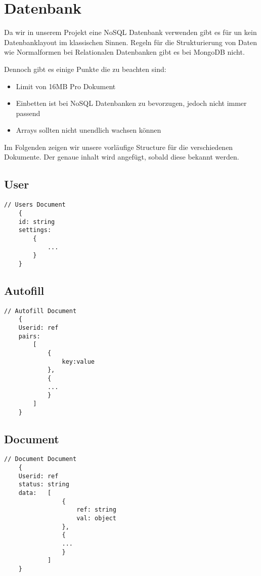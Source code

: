 \chapter{Datenbank}
Da wir in unserem Projekt eine NoSQL Datenbank verwenden gibt es für un kein Datenbanklayout im klassischen Sinnen.
Regeln für die Strukturierung von Daten wie Normalformen bei Relationalen Datenbanken gibt es bei MongoDB nicht.

Dennoch gibt es einige Punkte die zu beachten sind:
\begin{itemize}
    \item Limit von 16\ac{MB} Pro Dokument
    \item Einbetten ist bei NoSQL Datenbanken zu bevorzugen, jedoch nicht immer passend
    \item Arrays sollten nicht unendlich wachsen können
\end{itemize}

Im Folgenden zeigen wir unsere vorläufige Structure für die verschiedenen Dokumente.
Der genaue inhalt wird angefügt, sobald diese bekannt werden.

\section{User}

\begin{lstlisting}[label={lst:lstlistingusers}]
    // Users Document
    {
    id: string
    settings:
        {
            ...
        }
    }

\end{lstlisting}

\section{Autofill}
\begin{lstlisting}[label={lst:lstlistingauto}]
    // Autofill Document
    {
    Userid: ref
    pairs:
        [
            {
                key:value
            },
            {
            ...
            }
        ]
    }

\end{lstlisting}

\section{Document}
\begin{lstlisting}[label={lst:lstlistingdoc}]
    // Document Document
    {
    Userid: ref
    status: string
    data:   [
                {
                    ref: string
                    val: object
                },
                {
                ...
                }
            ]
    }

\end{lstlisting}